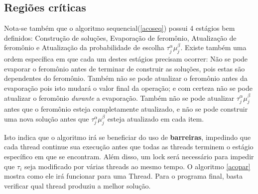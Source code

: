 \subsection{Regiões críticas}
Nota-se também que o algoritmo sequencial(\ref{acoseq}) possui 4 estágios bem definidos: Construção de soluções, Evaporação de feromônio, Atualização de feromônio e Atualização da probabilidade de escolha $\tau_j^\alpha \mu_j^\beta$. Existe também uma ordem específica em que cada um destes estágios precisam ocorrer: Não se pode evaporar o feromônio antes de terminar de construir as soluções, pois estas são dependentes do feromônio. Também não se pode atualizar o feromônio antes da evaporação pois isto mudará o valor final da operação; e com certeza não se pode atualizar o feromônio \textit{durante} a evaporação. Também não se pode atualizar $\tau_j^\alpha \mu_j^\beta$ antes que o feromônio esteja completamente atualizado, e não se pode construir uma nova solução antes que $\tau_j^\alpha \mu_j^\beta$ esteja atualizado em cada item.

Isto indica que o algoritmo irá se beneficiar do uso de \textbf{barreiras}, impedindo que cada thread continue sua execução antes que todas as threads terminem o estágio específico em que se encontram. Além disso, um lock será necessário para impedir que $\tau_i$ seja modificado por várias threads ao mesmo tempo. O algoritmo \ref{acopar} mostra como ele irá funcionar para uma Thread. Para o programa final, basta verificar qual thread produziu a melhor solução.

